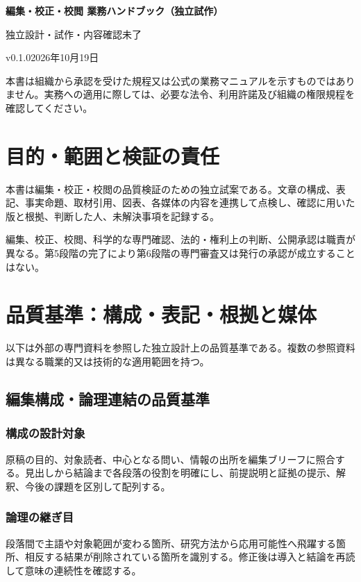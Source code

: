 \documentclass[a4paper,11pt]{article}
\begin{document}
\begin{center}
{\Large\bfseries 編集・校正・校閲 業務ハンドブック（独立試作）}\par\medskip
{\small 独立設計・試作・内容確認未了}\par
{\small v0.1.0\quad 2026年10月19日}\par
\end{center}
\vspace{6mm}
\noindent 本書は組織から承認を受けた規程又は公式の業務マニュアルを示すものではありません。実務への適用に際しては、必要な法令、利用許諾及び組織の権限規程を確認してください。\par
\tableofcontents
\clearpage
\section{目的・範囲と検証の責任}
\par 本書は編集・校正・校閲の品質検証のための独立試案である。文章の構成、表記、事実命題、取材引用、図表、各媒体の内容を連携して点検し、確認に用いた版と根拠、判断した人、未解決事項を記録する。\par\medskip
\par 編集、校正、校閲、科学的な専門確認、法的・権利上の判断、公開承認は職責が異なる。第5段階の完了により第6段階の専門審査又は発行の承認が成立することはない。\par\medskip
\section{品質基準：構成・表記・根拠と媒体}
\par 以下は外部の専門資料を参照した独立設計上の品質基準である。複数の参照資料は異なる職業的又は技術的な適用範囲を持つ。\par\medskip
\subsection{編集構成・論理連結の品質基準}
\subsubsection{構成の設計対象}
\par 原稿の目的、対象読者、中心となる問い、情報の出所を編集ブリーフに照合する。見出しから結論まで各段落の役割を明確にし、前提説明と証拠の提示、解釈、今後の課題を区別して配列する。\par\medskip
\subsubsection{論理の継ぎ目}
\par 段落間で主語や対象範囲が変わる箇所、研究方法から応用可能性へ飛躍する箇所、相反する結果が削除されている箇所を識別する。修正後は導入と結論を再読して意味の連続性を確認する。\par\medskip
\end{document}
